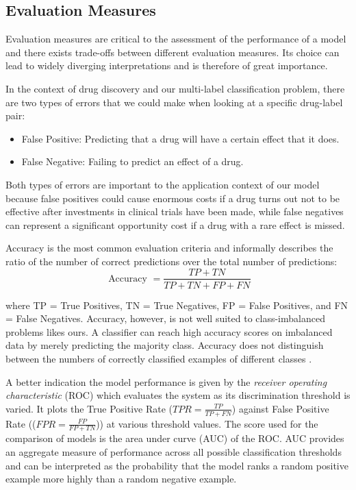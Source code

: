 \documentclass[bsc,frontabs,twoside,singlespacing,parskip,deptreport]{infthesis}     %
\begin{document}
\subsection{Evaluation Measures}
Evaluation measures are critical to the assessment of the performance of a model and there exists trade-offs between different evaluation measures. Its choice can lead to widely diverging interpretations and is therefore of great importance.

In the context of drug discovery and our multi-label classification problem, there are two types of errors that we could make when looking at a specific drug-label pair:
\begin{itemize}
    \item False Positive: Predicting that a drug will have a certain effect that it does.
    \item False Negative: Failing to predict an effect of a drug.
\end{itemize}

Both types of errors are important to the application context of our model because false positives could cause enormous costs if a drug turns out not to be effective after investments in clinical trials have been made, while false negatives can represent a significant opportunity cost if a drug with a rare effect is missed.

Accuracy is the most common evaluation criteria and informally describes the ratio of the number of correct predictions over the total number of predictions:
\[\text { Accuracy }=\frac{T P+T N}{T P+T N+F P+F N}\]

where TP = True Positives, TN = True Negatives, FP = False Positives, and FN = False Negatives.
Accuracy, however, is not well suited to class-imbalanced problems likes ours. A classifier can reach high accuracy scores on imbalanced data by merely predicting the majority class. Accuracy does not distinguish between the numbers of correctly classified examples of different classes \cite{galar_review_2012}.

A better indication the model performance is given by the \textit{receiver operating characteristic} (ROC) which evaluates the system as its discrimination threshold is varied. It plots the True Positive Rate (\(TPR=\frac{TP}{TP+FN}\)) against False Positive Rate ((\(FPR=\frac{FP}{FP+TN}\))) at various threshold values.
The score used for the comparison of models is the area under curve (AUC) of the ROC. AUC provides an aggregate measure of performance across all possible
classification thresholds and can be interpreted as the probability that the model ranks a random positive example more highly than a random negative example.
\end{document}

